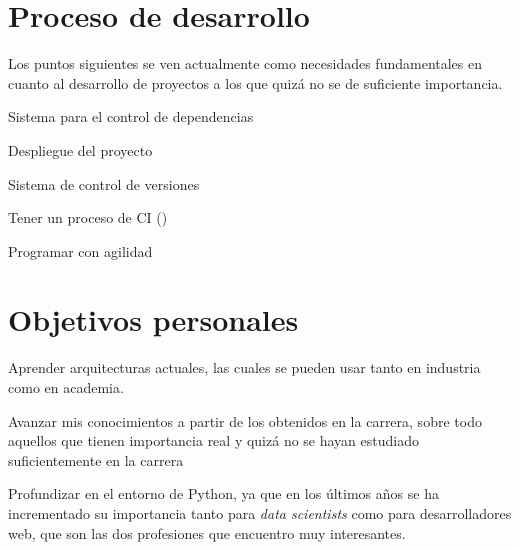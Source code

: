 \section{Proceso de desarrollo}
Los puntos siguientes se ven actualmente como necesidades fundamentales en cuanto al desarrollo de proyectos a los que quizá no se de suficiente importancia.
\begin{list}{-}{}
\item Sistema para el control de dependencias
\item Despliegue del proyecto
\item Sistema de control de versiones
\item Tener un proceso de CI () 
\item Programar con agilidad
\end{list}

\section{Objetivos personales}
\begin{list}{-}{}
\item Aprender arquitecturas actuales, las cuales se pueden usar tanto en industria como en academia.
\item Avanzar mis conocimientos a partir de los obtenidos en la carrera, sobre todo aquellos que tienen importancia real y quizá no se hayan estudiado suficientemente en la carrera
\item Profundizar en el entorno de Python, ya que en los últimos años se ha incrementado su importancia tanto para \textit{data scientists} como para desarrolladores web, que son las dos profesiones que encuentro muy interesantes.
\end{list}

